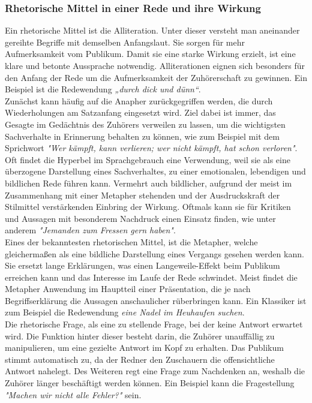 \subsubsection{Rhetorische Mittel in einer Rede und ihre Wirkung}
\label{sec: Rhetorische Mittel in einer Rede und ihre Wirkung}
Ein rhetorische Mittel ist die Alliteration. Unter dieser versteht man aneinander gereihte Begriffe mit demselben Anfangslaut. Sie sorgen für mehr Aufmerksamkeit vom Publikum. Damit sie eine starke Wirkung erzielt, ist eine klare und betonte Aussprache notwendig. Alliterationen eignen sich besonders für den Anfang der Rede um die Aufmerksamkeit der Zuhörerschaft zu gewinnen. Ein Beispiel ist die Redewendung \textit{„durch dick und dünn“}.
\\Zunächst kann häufig auf die Anapher zurückgegriffen werden, die durch Wiederholungen am Satzanfang eingesetzt wird. Ziel dabei ist immer, das Gesagte im Gedächtnis des Zuhörers verweilen zu lassen, um die wichtigsten Sachverhalte in Erinnerung behalten zu können, wie zum Beispiel mit dem Sprichwort \textit{"Wer kämpft, kann verlieren; wer nicht kämpft, hat schon verloren"}.
\\Oft findet die Hyperbel im Sprachgebrauch eine Verwendung, weil sie als eine überzogene Darstellung eines Sachverhaltes, zu einer emotionalen, lebendigen und bildlichen Rede führen kann. Vermehrt auch bildlicher, aufgrund der meist im Zusammenhang mit einer Metapher stehenden und der Ausdruckskraft der Stilmittel verstärkenden Einbring der Wirkung. Oftmals kann sie für Kritiken und Aussagen mit besonderem Nachdruck einen Einsatz finden, wie unter anderem \textit{"Jemanden zum Fressen gern haben"}.
\\Eines der bekanntesten rhetorischen Mittel, ist die Metapher, welche gleichermaßen als eine bildliche Darstellung eines Vergangs gesehen werden kann. Sie ersetzt lange Erklärungen, was einen Langeweile-Effekt beim Publikum erreichen kann und das Interesse im Laufe der Rede schwindet. Meist findet die Metapher Anwendung im Hauptteil einer Präsentation, die je nach Begriffserklärung die Aussagen anschaulicher rüberbringen kann. Ein Klassiker ist zum Beispiel die Redewendung \textit{eine Nadel im Heuhaufen suchen}.
\\Die rhetorische Frage, als eine zu stellende Frage, bei der keine Antwort erwartet wird. Die Funktion hinter dieser besteht darin, die Zuhörer unauffällig zu manipulieren, um eine gezielte Antwort im Kopf zu erhalten. Das Publikum stimmt automatisch zu, da der Redner den Zuschauern die offensichtliche Antwort nahelegt. Des Weiteren regt eine Frage zum Nachdenken an, weshalb die Zuhörer länger beschäftigt werden können. Ein Beispiel kann die Fragestellung \textit{"Machen wir nicht alle Fehler?"} sein.
